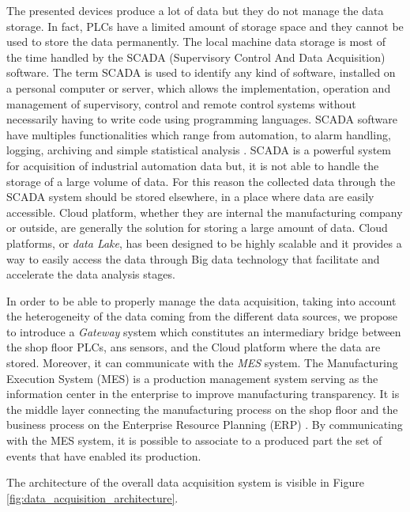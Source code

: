 The presented devices produce a lot of data but they do not manage the data storage. In fact, PLCs have a limited amount of storage space and they cannot be used to store the data permanently. The local machine data storage is most of the time handled by the SCADA (Supervisory Control And Data Acquisition) software. The term SCADA is used to identify any kind of software, installed on a personal computer or server, which allows the implementation, operation and management of supervisory, control and remote control systems without necessarily having to write code using programming languages. SCADA software have multiples functionalities which range from automation, to alarm handling, logging, archiving and simple statistical analysis \citep{daneels1999scada}. SCADA is a powerful system for acquisition of industrial automation data but, it is not able to handle the storage of a large volume of data. For this reason the collected data through the SCADA system should be stored elsewhere, in a place where data are easily accessible. Cloud platform, whether they are internal the manufacturing company or outside, are generally the solution for storing a large amount of data. Cloud platforms, or \textit{data Lake}, has been designed to be highly scalable and it provides a way to easily access the data through Big data technology that facilitate and accelerate the data analysis stages.  

In order to be able to properly manage the data acquisition, taking into account the heterogeneity of the data coming from the different data sources, we propose to introduce a \textit{Gateway} system which constitutes an intermediary bridge between the shop floor PLCs, ans sensors, and the Cloud platform where the data are stored. Moreover, it can communicate with the \textit{MES} system. The Manufacturing Execution System (MES) is a production management system serving as the information center in the enterprise to improve manufacturing transparency. It is the middle layer connecting the manufacturing process on the shop floor and the business process on the Enterprise Resource Planning (ERP) \citep{chen2020implementation}. By communicating with the MES system, it is possible to associate to a produced part the set of events that have enabled its production.

The architecture of the overall data acquisition system is visible in Figure \ref{fig:data_acquisition_architecture}.

